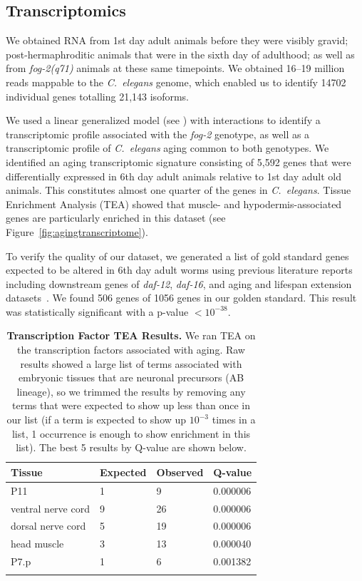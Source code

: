 \documentclass[9pt,twocolumn,twoside]{gsag3jnl}
\newcommand{\cel}{\emph{C.~elegans}}
\newcommand{\fog}{\emph{fog-2}}
\newcommand{\agen}{5,592}
\newcommand{\goldn}{1056}
\newcommand{\goldfound}{506}
\newcommand{\goldpval}{$<10^{-38}$}
\begin{document}
\subsection*{Transcriptomics}
\label{sub:Transcriptomics}

We obtained RNA from 1st day adult animals before they were visibly gravid; post-hermaphroditic animals that were in the sixth day of adulthood; as well as from \fog{}\emph{(q71)} animals at these same timepoints. We obtained 16--19 million reads mappable to the \cel{} genome, which enabled us to identify 14702 individual genes totalling 21,143 isoforms.

We used a linear generalized model (see ) with interactions to identify a transcriptomic profile associated with the \fog{} genotype, as well as a transcriptomic profile of \cel{} aging common to both genotypes. We identified an aging transcriptomic signature consisting of \agen{} genes that were differentially expressed in 6th day adult animals relative to 1st day adult old animals. This constitutes almost one quarter of the genes in \cel{}. Tissue Enrichment Analysis (TEA) showed that muscle- and hypodermis-associated genes are particularly enriched in this dataset (see Figure~\ref{fig:agingtranscriptome}).

To verify the quality of our dataset, we generated a list of gold standard genes expected to be altered in 6th day adult worms using previous literature reports including downstream genes of \emph{daf-12}, \emph{daf-16}, and aging and lifespan extension datasets~\citep{Murphy2003,Halaschek-wiener2005,Lund2002,McCormick2012,Eckley2013}. We found \goldfound{} genes of \goldn{} genes in our golden standard. This result was statistically significant with a p-value \goldpval{}.

\begin{table}
\renewcommand{\familydefault}{\sfdefault}\normalfont{}
\centering
\caption{\textbf{Transcription Factor TEA Results.} We ran TEA on the transcription factors associated with aging. Raw results showed a large list of terms associated with embryonic tissues that are neuronal precursors (AB lineage), so we trimmed the results by removing any terms that were expected to show up less than once in our list (if a term is expected to show up $10^{-3}$ times in a list, 1 occurrence is enough to show enrichment in this list). The best 5 results by Q-value are shown below.}
\begin{tableminipage}{\textwidth}
\begin{tabularx}{\textwidth}{XXXX}
\toprule
\header{}Tissue & Expected & Observed & Q-value \\
\bottomrule{}
P11	& 1 & 9 & 0.000006\\
ventral nerve cord &	9 &	26 &	0.000006\\
dorsal nerve cord &	5 &	19 & 0.000006\\
head muscle	& 3	& 13 &	0.000040\\
P7.p & 1 &	6	& 0.001382\\
\bottomrule{}
\end{tabularx}
\label{tab:tea_tf_age}
\end{tableminipage}
\end{table}
\end{document}
